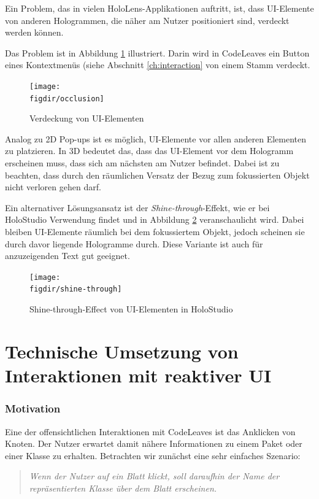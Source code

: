 Ein Problem, das in vielen HoloLens-Applikationen auftritt, ist, dass UI-Elemente von anderen Hologrammen, die näher am Nutzer positioniert sind, verdeckt werden können.

Das Problem ist in Abbildung \ref{fig:occlusion} illustriert. Darin wird in CodeLeaves ein Button eines Kontextmenüs (siehe Abschnitt \ref{ch:interaction} von einem Stamm verdeckt.

\begin{figure}[htb]
  \texttt{[image: \\figdir/occlusion]}
  \caption{Verdeckung von UI-Elementen}
  \label{fig:occlusion}
\end{figure}

Analog zu 2D Pop-ups ist es möglich, UI-Elemente vor allen anderen Elementen zu platzieren. In 3D bedeutet das, dass das UI-Element vor dem Hologramm erscheinen muss, dass sich am nächsten am Nutzer befindet. Dabei ist zu beachten, dass durch den räumlichen Versatz der Bezug zum fokussierten Objekt nicht verloren gehen darf.

Ein alternativer Lösungsansatz ist der \textit{Shine-through}-Effekt, wie er bei HoloStudio Verwendung findet und in Abbildung \ref{fig:shine-through} veranschaulicht wird. Dabei bleiben UI-Elemente räumlich bei dem fokussiertem Objekt, jedoch scheinen sie durch davor liegende Hologramme durch. Diese Variante ist auch für anzuzeigenden Text gut geeignet.

\begin{figure}[htb]
  \texttt{[image: \\figdir/shine-through]}
  \caption{Shine-through-Effect von UI-Elementen in HoloStudio \cite{windows2017casestudy3}}
  \label{fig:shine-through}
\end{figure}

\section{Technische Umsetzung von Interaktionen mit reaktiver UI}

\subsubsection*{Motivation}
Eine der offensichtlichen Interaktionen mit CodeLeaves ist das Anklicken von Knoten. Der Nutzer erwartet damit nähere Informationen zu einem Paket oder einer Klasse zu erhalten. Betrachten wir zunächst eine sehr einfaches Szenario:

\begin{quotation}
  \textit{Wenn der Nutzer auf ein Blatt klickt, soll daraufhin der Name der repräsentierten Klasse über dem Blatt erscheinen.}
\end{quotation}

